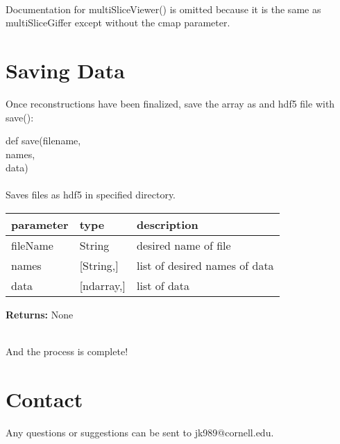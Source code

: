 \documentclass[10pt]{article}
\begin{document}
\ \\Documentation for multiSliceViewer() is omitted because it is the same as multiSliceGiffer except without the cmap parameter.\\

\section{Saving Data}
Once reconstructions have been finalized, save the array as and hdf5 file with save():\\
\begin{center} def save(filename,\\ names,\\ data)\\ %
\ \\ Saves files as hdf5 in specified directory.
\begin{table}[H]
    \centering
    \begin{tabular}{|l|l|l|}
        \hline
        \textbf{parameter} & \textbf{type} &\textbf{description}  \\ \hline
        fileName&String& desired name of file\\ \hline
        names & [String,] & list of desired names of data\\ \hline 
        data&[ndarray,]& list of data\\ \hline
    \end{tabular}
\end{table}
\textbf{Returns:} None\\
\end{center}
\ \\ And the process is complete!
\section*{Contact}\label{Contact}
Any questions or suggestions can be sent to jk989@cornell.edu.
\end{document}
